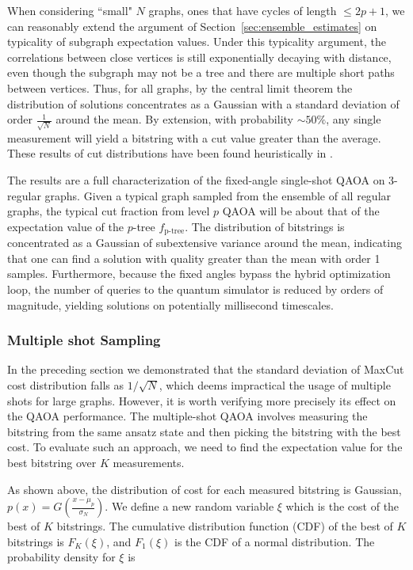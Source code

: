 When considering ``small" $N$ graphs, ones that have cycles of length $\leq 2p+1$, we can reasonably  extend the argument of Section~\ref{sec:ensemble_estimates} on typicality of subgraph expectation values. Under this typicality argument, the correlations between close vertices is still exponentially decaying with distance, even though the subgraph may not be a tree and there are multiple short paths between vertices. Thus, for all graphs, by the central limit theorem the distribution of solutions concentrates as a Gaussian with a standard deviation of order $\frac{1}{\sqrt{N}}$ around the mean. By extension, with probability $\sim 50\%$, any single measurement will yield a bitstring with a cut value greater than the average. These results of cut distributions have been found heuristically in \cite{larkin2020evaluation}.

\quad

The results are a full characterization of the fixed-angle single-shot QAOA on 3-regular graphs. Given a typical graph sampled from the ensemble of all regular graphs, the typical cut fraction from level $p$ QAOA will be about that of the expectation value of the $p$-tree $f_{\text{p-tree}}$. The distribution of bitstrings is concentrated as a Gaussian of subextensive variance around the mean, indicating that one can find a solution with quality greater than the mean with order 1 samples. Furthermore, because the fixed angles bypass the hybrid optimization loop, the number of queries to the quantum simulator is reduced by orders of magnitude, yielding solutions on potentially  millisecond timescales.


\subsubsection{Multiple shot Sampling}
\label{sec:multi-shot}


In the preceding section we demonstrated that the  standard deviation of MaxCut cost distribution falls as $1/\sqrt{N}$, which deems impractical the usage of multiple shots for large graphs. However, it is worth verifying more precisely  its effect  on the QAOA performance.
The multiple-shot QAOA involves measuring the bitstring from the same ansatz state and then picking the bitstring with the best cost. 
To evaluate such an approach, we need to find the expectation value for the best bitstring over $K$ measurements.

As shown above, the distribution of cost for each measured bitstring is  Gaussian, $p(x) = G(\frac{x-\mu_p}{\sigma_N})$.
We define a new random variable $\xi$ which is the cost of the best of $K$ bitstrings.
The cumulative distribution function (CDF) of the best of $K$ bitstrings is $F_K(\xi)$, and $F_1(\xi)$ is the CDF of a normal distribution.
The probability density for $\xi$ is

